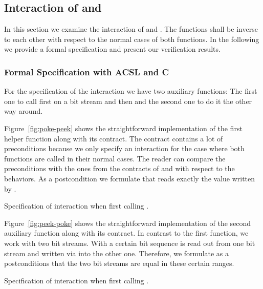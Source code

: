 \clearpage
\subsection{Interaction of \peek and \poke}
\label{interaction}


In this section we examine the interaction of 
\peek and \poke. The functions shall be inverse to each other
with respect to the normal cases of both functions.
In the following we provide a formal specification and present
our verification results.


\subsubsection{Formal Specification with ACSL and C}

For the specification of the interaction we have two auxiliary \isoc functions:
The first one to call first \poke on a bit stream and then \peek
and the second one to do it the other way around.

Figure~\ref{fig:poke-peek} shows the straightforward implementation 
of the first helper function along with its \acsl contract.
The contract contains a lot of preconditions because we
only specify an interaction for the case where both 
functions are called in their normal
cases. The reader can compare the preconditions with the ones from
the contracts of \peek and \poke with respect to the  behaviors.
As a postcondition we formulate that \peek reads exactly the value
written by \poke.

\begin{listing}[hbt]
\begin{minipage}{\textwidth}

\end{minipage}
\caption{\label{fig:poke-peek} Specification of interaction when first calling \poke.}
\end{listing}

Figure~\ref{fig:peek-poke} shows the straightforward implementation 
of the second auxiliary function along with its \acsl contract.
In contrast to the first function, we work with two bit streams.
With \peek a certain bit sequence is read out from one bit stream
and written via \poke into the other one.
Therefore, we formulate as a postconditions that
the two bit streams are equal in these certain ranges.

\begin{listing}[hbt]
\begin{minipage}{\textwidth}

\end{minipage}
\caption{\label{fig:peek-poke} Specification of interaction when first calling \peek.}
\end{listing}

